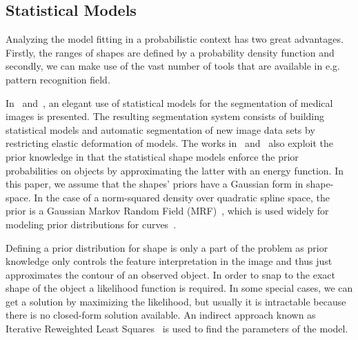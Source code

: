 \documentclass[conference]{IEEEtran}
\begin{document}
\subsection{Statistical Models}
\label{sec:sm}
Analyzing the model fitting in a probabilistic
context has two great advantages. Firstly, the ranges of shapes are defined by a
probability density function and secondly, we can make use of the vast number 
of tools that are available in e.g. pattern recognition field.

In~\cite{kelemen1999three} and~\cite{kelemen1999elastic}, an elegant
use of statistical models for the segmentation of medical images is
presented. The resulting segmentation system consists of building
statistical models and automatic segmentation of new image data
sets by restricting elastic deformation of models. The works
in~\cite{sclaroff2001deformable} and~\cite{liu1999deformable} also
exploit the prior knowledge in that the statistical shape models enforce the prior
probabilities on objects by approximating the latter with an energy function.  
In this paper, we assume that the shapes' priors have a Gaussian form in
shape-space. In the case of a norm-squared density over  quadratic spline space,
the prior is a Gaussian Markov Random Field (MRF)~\cite{blake1998active}, 
which is used widely  for modeling prior distributions for 
curves~\cite{storvik1994bayesian}.

Defining a prior distribution for shape is only a part of the
problem as prior knowledge only controls the feature interpretation in the
image and thus just approximates the contour of an observed object. In
order to snap to the exact shape of the object a likelihood function is required. In some
special cases, we can get a solution by maximizing the likelihood, but
usually it is intractable because there is no closed-form solution available. 
An indirect approach known as Iterative Reweighted Least Squares~\cite{bishop2006pattern} 
is used to find the parameters of the model.
\end{document}
